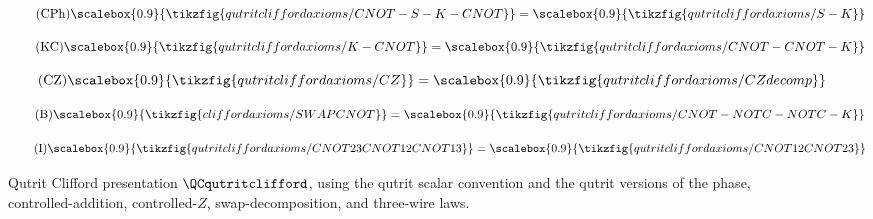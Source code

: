 \begin{figure}[ht]
{\begin{minipage}{0.975\linewidth}
\begin{minipage}[c]{0.35\linewidth}
      \begin{equation}\tag{CPh}\label{qt-cnotremove}
        \scalebox{0.9}{\tikzfig{qutritcliffordaxioms/CNOT-S-K-CNOT}} = \scalebox{0.9}{\tikzfig{qutritcliffordaxioms/S-K}}
      \end{equation}
    \end{minipage}\vspace{-0.6em}
    \begin{minipage}[c]{0.38\linewidth}\centering
      \begin{equation}\tag{KC}\label{qt-kcnot}
        \scalebox{0.9}{\tikzfig{qutritcliffordaxioms/K-CNOT}} = \scalebox{0.9}{\tikzfig{qutritcliffordaxioms/CNOT-CNOT-K}}
      \end{equation}
    \end{minipage}
    \begin{minipage}[c]{0.57\linewidth}\centering
      \begin{equation}\tag{CZ}\label{qt-czdecomp}
        \scalebox{0.9}{\tikzfig{qutritcliffordaxioms/CZ}} = \scalebox{0.9}{\tikzfig{qutritcliffordaxioms/CZdecomp}}
      \end{equation}
    \end{minipage}\vspace{-0.6em}
    \begin{minipage}[c]{0.36\linewidth}\centering
      \begin{equation}\tag{B}\label{qt-swapdecomp}
        \scalebox{0.9}{\tikzfig{cliffordaxioms/SWAPCNOT}} = \scalebox{0.9}{\tikzfig{qutritcliffordaxioms/CNOT-NOTC-NOTC-K}}
      \end{equation}
    \end{minipage}
    \begin{minipage}[c]{0.29\linewidth}\centering
      \begin{equation}\tag{I}\label{qt-I}
        \scalebox{0.9}{\tikzfig{qutritcliffordaxioms/CNOT23CNOT12CNOT13}} = \scalebox{0.9}{\tikzfig{qutritcliffordaxioms/CNOT12CNOT23}}
      \end{equation}
    \end{minipage}
    \end{minipage}}
    \caption{Qutrit Clifford presentation \(\QCqutritclifford\), using the qutrit scalar convention and the qutrit versions of the phase, controlled-addition, controlled-\(Z\), swap-decomposition, and three-wire laws.}
    \label{fig:qutritcliffordaxioms}
\end{figure}
